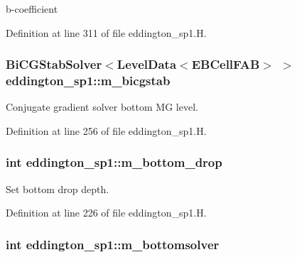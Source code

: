 b-\/coefficient 



Definition at line 311 of file eddington\+\_\+sp1.\+H.

\subsubsection[{\texorpdfstring{m\+\_\+bicgstab}{m_bicgstab}}]{\setlength{\rightskip}{0pt plus 5cm}Bi\+C\+G\+Stab\+Solver$<$Level\+Data$<$E\+B\+Cell\+F\+AB$>$ $>$ eddington\+\_\+sp1\+::m\+\_\+bicgstab\hspace{0.3cm}{\ttfamily [protected]}}\hypertarget{classeddington__sp1_a9eeefe164c8f3103d6e5298e4d2542cf}{}\label{classeddington__sp1_a9eeefe164c8f3103d6e5298e4d2542cf}


Conjugate gradient solver bottom MG level. 



Definition at line 256 of file eddington\+\_\+sp1.\+H.

\subsubsection[{\texorpdfstring{m\+\_\+bottom\+\_\+drop}{m_bottom_drop}}]{\setlength{\rightskip}{0pt plus 5cm}int eddington\+\_\+sp1\+::m\+\_\+bottom\+\_\+drop\hspace{0.3cm}{\ttfamily [protected]}}\hypertarget{classeddington__sp1_abeeeb6469977bff3220d268dab6c8347}{}\label{classeddington__sp1_abeeeb6469977bff3220d268dab6c8347}


Set bottom drop depth. 



Definition at line 226 of file eddington\+\_\+sp1.\+H.

\subsubsection[{\texorpdfstring{m\+\_\+bottomsolver}{m_bottomsolver}}]{\setlength{\rightskip}{0pt plus 5cm}int eddington\+\_\+sp1\+::m\+\_\+bottomsolver\hspace{0.3cm}{\ttfamily [protected]}}\hypertarget{classeddington__sp1_ab9bb350b96167e92380f72890728cb24}{}\label{classeddington__sp1_ab9bb350b96167e92380f72890728cb24}


